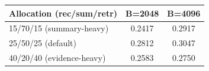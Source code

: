 \begin{tabular}{lcc}
\toprule
Allocation (rec/sum/retr) & B=2048 & B=4096 \\
\midrule
15/70/15 (summary-heavy) & 0.2417 & 0.2917 \\
25/50/25 (default) & 0.2812 & 0.3047 \\
40/20/40 (evidence-heavy) & 0.2583 & 0.2750 \\
\bottomrule
\end{tabular}